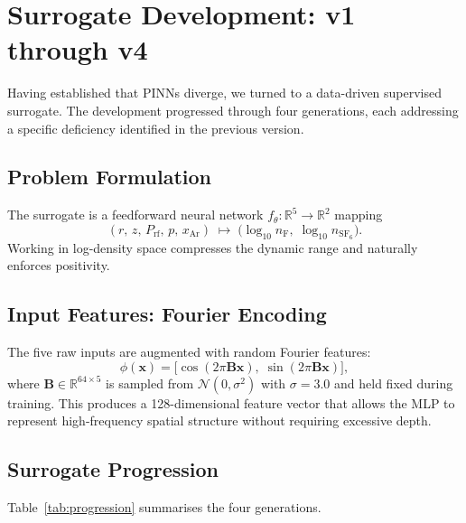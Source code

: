 \documentclass[12pt,a4paper]{article}
\begin{document}
\section{Surrogate Development: v1 through v4}
\label{sec:surrogate}

Having established that PINNs diverge, we turned to a data-driven
supervised surrogate.  The development progressed through four
generations, each addressing a specific deficiency identified in the
previous version.

\subsection{Problem Formulation}

The surrogate is a feedforward neural network
$f_\theta : \mathbb{R}^5 \to \mathbb{R}^2$ mapping
\begin{equation}
  (r,\, z,\, P_{\text{rf}},\, p,\, x_{\text{Ar}})
  \;\longmapsto\;
  \bigl(\log_{10} n_{\text{F}},\;
         \log_{10} n_{\text{SF}_6}\bigr).
  \label{eq:surrogate_map}
\end{equation}
Working in log-density space compresses the dynamic range and
naturally enforces positivity.

\subsection{Input Features: Fourier Encoding}

The five raw inputs are augmented with random Fourier features:
\begin{equation}
  \phi(\mathbf{x}) =
  \bigl[\cos(2\pi \mathbf{B}\mathbf{x}),\;
         \sin(2\pi \mathbf{B}\mathbf{x})\bigr],
  \label{eq:fourier}
\end{equation}
where $\mathbf{B} \in \mathbb{R}^{64 \times 5}$ is sampled from
$\mathcal{N}(0, \sigma^2)$ with $\sigma = 3.0$ and held fixed during
training.  This produces a 128-dimensional feature vector that
allows the MLP to represent high-frequency spatial structure
without requiring excessive depth.

\subsection{Surrogate Progression}

Table~\ref{tab:progression} summarises the four generations.
\end{document}
